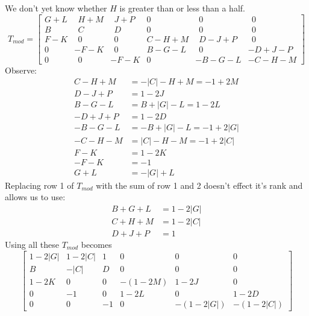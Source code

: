 We don't yet know whether $H$ is greater than or less than a half.
\begin{equation*}
T_{mod} =
\begin{bmatrix}
G\!+\!L & ~~H\!+\!M & ~~J\!+\!P &       0       &       ~~0       &      ~~0       \\
   B    &    ~~C    &    ~~D    &       0       &       ~~0       &      ~~0       \\
F\!-\!K &    ~~0    &    ~~0    & C\!-\!H\!+\!M & ~~D\!-\!J\!+\!P &      ~~0       \\
   0    &  -F\!-\!K &    ~~0    & B\!-\!G\!-\!L &       ~~0       & -D\!+\!J\!-\!P \\
   0    &    ~~0    &  -F\!-\!K &       0       &  -B\!-\!G\!-\!L & -C\!-\!H\!-\!M
\end{bmatrix}
\end{equation*}
Observe:
\begin{align*}
 C-H+M &= -|C|-H+M = -1+2M   \\
 D-J+P &= 1-2J               \\
 B-G-L &= B+|G|-L = 1-2L     \\
-D+J+P &= 1-2D               \\
-B-G-L &= -B+|G|-L = -1+2|G| \\
-C-H-M &= |C|-H-M = -1+2|C|  \\
   F-K &= 1-2K               \\
  -F-K &= -1                 \\
   G+L &= -|G|+L
\end{align*}
Replacing row 1 of $T_{mod}$ with the sum of row 1 and 2 doesn't effect it's
rank and allows us to use:
\begin{align*}
B+G+L &= 1-2|G| \\
C+H+M &= 1-2|C| \\
D+J+P &= 1
\end{align*}
Using all these $T_{mod}$ becomes
\begin{equation*}
\begin{bmatrix}
1-2|G| & 1-2|C| &  1 &    0    &    0      &    0      \\
  B    & -|C|   &  D &    0    &    0      &    0      \\
1-2K   &   0    &  0 & -(1-2M) &   1-2J    &    0      \\
  0    &  -1    &  0 &   1-2L  &    0      &   1-2D    \\
  0    &   0    & -1 &    0    & -(1-2|G|) & -(1-2|C|)
\end{bmatrix}
\end{equation*}
